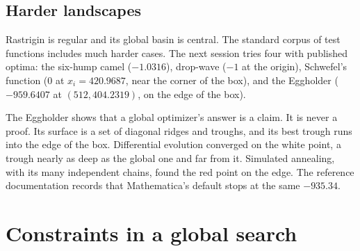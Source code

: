 
\subsection{Harder landscapes}

Rastrigin is regular and its global basin is central. The standard corpus of
test functions includes much harder cases. The next session tries four with
published optima: the six-hump camel (\(-1.0316\)), drop-wave (\(-1\) at the
origin), Schwefel's function (\(0\) at \(x_i = 420.9687\), near the corner of
the box), and the Eggholder (\(-959.6407\) at \((512, 404.2319)\), on the edge
of the box).

\begin{codepairs}
\end{codepairs}


The Eggholder shows that a global optimizer's answer is a claim. It is never a
proof.
Its surface is a set of diagonal ridges and troughs, and its best trough runs
into the edge of the box. Differential evolution converged on the white point,
a trough nearly as deep as the global one and far from it. Simulated annealing,
with its many independent chains, found the red point on the edge. The
reference documentation records that Mathematica's default 
stops at the same \(-935.34\).

\section{Constraints in a global search}
\label{sec:opt-global-constraints}

